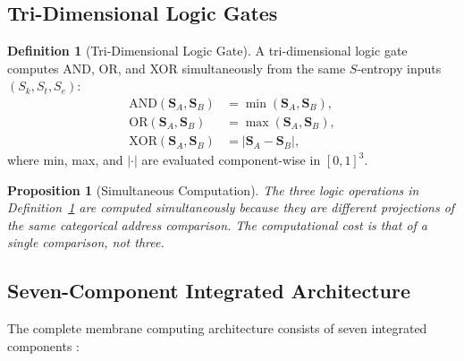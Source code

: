 \documentclass[12pt]{article}
\newtheorem{proposition}[theorem]{Proposition}
\theoremstyle{definition}
\newtheorem{definition}[theorem]{Definition}
\theoremstyle{remark}
\newcommand{\Sk}{S_k}
\newcommand{\St}{S_t}
\newcommand{\Se}{S_e}
\begin{document}
\subsection{Tri-Dimensional Logic Gates}

\begin{definition}[Tri-Dimensional Logic Gate]
\label{def:tri_gate}
A tri-dimensional logic gate computes AND, OR, and XOR simultaneously from the same $S$-entropy inputs $(\Sk, \St, \Se)$:
\begin{align}
  \mathrm{AND}(\mathbf{S}_A, \mathbf{S}_B) &= \min(\mathbf{S}_A, \mathbf{S}_B), \label{eq:tri_and} \\
  \mathrm{OR}(\mathbf{S}_A, \mathbf{S}_B) &= \max(\mathbf{S}_A, \mathbf{S}_B), \label{eq:tri_or} \\
  \mathrm{XOR}(\mathbf{S}_A, \mathbf{S}_B) &= |\mathbf{S}_A - \mathbf{S}_B|, \label{eq:tri_xor}
\end{align}
where min, max, and $|\cdot|$ are evaluated component-wise in $[0,1]^3$.
\end{definition}

\begin{proposition}[Simultaneous Computation]
\label{prop:simultaneous}
The three logic operations in Definition~\ref{def:tri_gate} are computed simultaneously because they are different projections of the same categorical address comparison. The computational cost is that of a single comparison, not three.
\end{proposition}

\subsection{Seven-Component Integrated Architecture}

The complete membrane computing architecture consists of seven integrated components \cite{sachikonye2025circuits, sachikonye2025cpu}:
\end{document}
